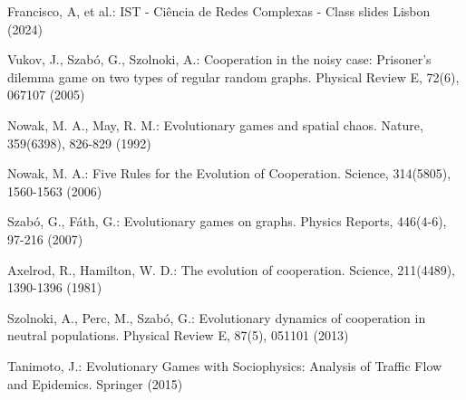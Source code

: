 \documentclass[runningheads]{llncs}
\begin{document}
%
%
% 
% 
%
\begin{thebibliography}{8}
Francisco, A, et al.: IST - Ciência de Redes Complexas - Class slides
Lisbon (2024)


Vukov, J., Szabó, G., Szolnoki, A.: Cooperation in the noisy case: Prisoner's dilemma game on two types of regular random graphs. Physical Review E, 72(6), 067107 (2005)

Nowak, M. A., May, R. M.: Evolutionary games and spatial chaos. Nature, 359(6398), 826-829 (1992)

Nowak, M. A.: Five Rules for the Evolution of Cooperation. Science, 314(5805), 1560-1563 (2006)

Szabó, G., Fáth, G.: Evolutionary games on graphs. Physics Reports, 446(4-6), 97-216 (2007)

Axelrod, R., Hamilton, W. D.: The evolution of cooperation. Science, 211(4489), 1390-1396 (1981)

Szolnoki, A., Perc, M., Szabó, G.: Evolutionary dynamics of cooperation in neutral populations. Physical Review E, 87(5), 051101 (2013)

Tanimoto, J.: Evolutionary Games with Sociophysics: Analysis of Traffic Flow and Epidemics. Springer (2015)

\end{thebibliography}
\end{document}
